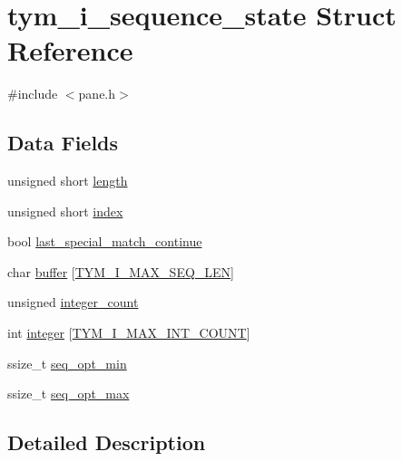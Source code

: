 \hypertarget{structtym__i__sequence__state}{}\section{tym\+\_\+i\+\_\+sequence\+\_\+state Struct Reference}
\label{structtym__i__sequence__state}


{\ttfamily \#include $<$pane.\+h$>$}

\subsection*{Data Fields}
\begin{DoxyCompactItemize}
\item 
unsigned short \hyperlink{structtym__i__sequence__state_a50d87f73d1f515a6af2ad3d380f32e05}{length}
\item 
unsigned short \hyperlink{structtym__i__sequence__state_a42f86532736babdf8955f997ffc2a4be}{index}
\item 
bool \hyperlink{structtym__i__sequence__state_aec7193d66f1b64bdc0003fcd82c61b15}{last\+\_\+special\+\_\+match\+\_\+continue}
\item 
char \hyperlink{structtym__i__sequence__state_a782d1f5d5590a0c339657a6a7ee7679a}{buffer} \mbox{[}\hyperlink{pane_8h_a726ca809ffd3d67ab4b8476646f26635ac35729e5f4e19e4337cbf8691369ae11}{T\+Y\+M\+\_\+\+I\+\_\+\+M\+A\+X\+\_\+\+S\+E\+Q\+\_\+\+L\+EN}\mbox{]}
\item 
unsigned \hyperlink{structtym__i__sequence__state_a2c3cfeb6d712fadd5d9e33fb81d0935f}{integer\+\_\+count}
\item 
int \hyperlink{structtym__i__sequence__state_a4faa974740f6d54f73dc138db2d2bbae}{integer} \mbox{[}\hyperlink{pane_8h_a726ca809ffd3d67ab4b8476646f26635a084f298d7fdbb074cc4551357c23d567}{T\+Y\+M\+\_\+\+I\+\_\+\+M\+A\+X\+\_\+\+I\+N\+T\+\_\+\+C\+O\+U\+NT}\mbox{]}
\item 
ssize\+\_\+t \hyperlink{structtym__i__sequence__state_a67bf9d70d6fd7bdf6b67f1a704d2f7dc}{seq\+\_\+opt\+\_\+min}
\item 
ssize\+\_\+t \hyperlink{structtym__i__sequence__state_a8e140f08f16bf4d54a5bbcf03bf6b00d}{seq\+\_\+opt\+\_\+max}
\end{DoxyCompactItemize}


\subsection{Detailed Description}


